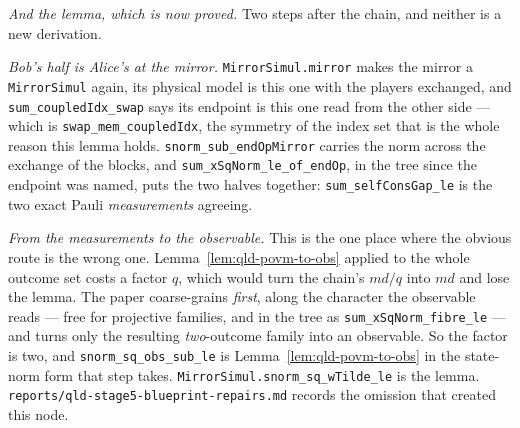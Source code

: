 \emph{And the lemma, which is now proved.} Two steps after the chain, and neither is a new
derivation.

\emph{Bob's half is Alice's at the mirror.} \texttt{MirrorSimul.mirror} makes the mirror a
\texttt{MirrorSimul} again, its physical model is this one with the players exchanged, and
\texttt{sum\_coupledIdx\_swap} says its endpoint is this one read from the other side --- which is
\texttt{swap\_mem\_coupledIdx}, the symmetry of the index set that is the whole reason this lemma
holds. \texttt{snorm\_sub\_endOpMirror} carries the norm across the exchange of the blocks, and
\texttt{sum\_xSqNorm\_le\_of\_endOp}, in the tree since the endpoint was named, puts the two
halves together: \texttt{sum\_selfConsGap\_le} is the two exact Pauli \emph{measurements}
agreeing.

\emph{From the measurements to the observable.} This is the one place where the obvious route is
the wrong one. Lemma~\ref{lem:qld-povm-to-obs} applied to the whole outcome set costs a factor
$q$, which would turn the chain's $md/q$ into $md$ and lose the lemma. The paper coarse-grains
\emph{first}, along the character the observable reads --- free for projective families, and in
the tree as \texttt{sum\_xSqNorm\_fibre\_le} --- and turns only the resulting \emph{two}-outcome
family into an observable. So the factor is two, and \texttt{snorm\_sq\_obs\_sub\_le} is
Lemma~\ref{lem:qld-povm-to-obs} in the state-norm form that step takes.
\texttt{MirrorSimul.snorm\_sq\_wTilde\_le} is the lemma.
\texttt{reports/qld-stage5-blueprint-repairs.md} records the omission that created this node.

\effortHard

